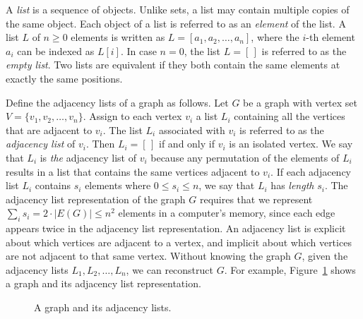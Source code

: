 A \emph{list} is a sequence of objects. Unlike sets, a list may
contain multiple copies of the same object. Each object of a list is
referred to as an \emph{element} of the list. A list $L$ of
$n \geq 0$ elements is written as $L = [a_1, a_2, \dots, a_n]$, where
the $i$-th element $a_i$ can be indexed as $L[i]$. In case $n = 0$,
the list $L = [\,]$ is referred to as the \emph{empty list}. Two lists
are equivalent if they both contain the same elements at exactly the
same positions.

Define the adjacency lists of a graph as follows. Let $G$ be a graph
with vertex set $V = \{v_1, v_2, \dots, v_n\}$. Assign to each vertex
$v_i$ a list $L_i$ containing all the vertices that are adjacent to
$v_i$. The list $L_i$ associated with $v_i$ is referred to as the
\emph{adjacency list} of $v_i$. Then $L_i = [\,]$ if and only if $v_i$
is an isolated vertex. We say that $L_i$ is \emph{the} adjacency list
of $v_i$ because any permutation of the elements of $L_i$ results in a
list that contains the same vertices adjacent to $v_i$. If each
adjacency list $L_i$ contains $s_i$ elements where
$0 \leq s_i \leq n$, we say that $L_i$ has \emph{length} $s_i$. The
adjacency list representation of the graph $G$ requires that we
represent $\sum_i s_i = 2 \cdot |E(G)| \leq n^2$ elements in a
computer's memory, since each edge appears twice in the adjacency list
representation. An adjacency list is explicit about which vertices are
adjacent to a vertex, and implicit about which vertices are not
adjacent to that same vertex. Without knowing the graph $G$, given the
adjacency lists $L_1, L_2, \dots, L_n$, we can reconstruct $G$. For
example, Figure~\ref{fig:graph_algorithms:graph_adjacency_lists} shows
a graph and its adjacency list representation.

\begin{figure}[!htbp]
\centering
{}
\caption{A graph and its adjacency lists.}
\label{fig:graph_algorithms:graph_adjacency_lists}
\end{figure}


